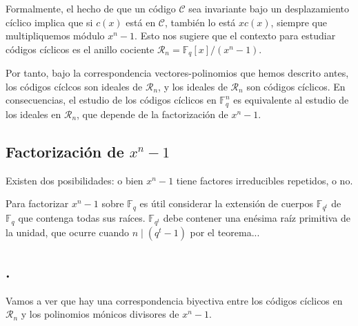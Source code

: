 Formalmente, el hecho de que un código \(\mathcal C\) sea invariante bajo un desplazamiento cíclico implica que si \(c(x)\) está en \(\mathcal C\), también lo está \(xc(x)\), siempre que multipliquemos módulo \(x^n -1\). 
Esto nos sugiere que el contexto para estudiar códigos cíclicos es el anillo cociente \(\mathcal R_n = \mathbb F_q[x]/(x^n - 1)\).

Por tanto, bajo la correspondencia vectores-polinomios que hemos descrito antes, los códigos cíclcos son ideales de \(\mathcal R_n\), y los ideales de \(\mathcal R_n\) son códigos cíclicos.
En consecuencias, el estudio de los códigos cíclicos en \(\mathbb F_q^n\) es equivalente al estudio de los ideales en \(\mathcal R_n\), que depende de la factorización de \(x^n-1\).

\subsection{Factorización de \(x^n -1\)}

Existen dos posibilidades: o bien \(x^n -1\) tiene factores irreducibles repetidos, o no.

Para factorizar \(x^n - 1\) sobre \(\mathbb F_q\) es útil considerar la extensión de cuerpos \(\mathbb F_{q^t}\) de \(\mathbb F_q\) que contenga todas sus raíces.
\(\mathbb F_{q^t}\) debe contener una enésima raíz primitiva de la unidad, que ocurre cuando \(n \mid (q^t - 1)\) por el teorema... 

\subsection{.}

Vamos a ver que hay una correspondencia biyectiva entre los códigos cíclicos en \(\mathcal R_n\) y los polinomios mónicos divisores de \(x^n-1\).


